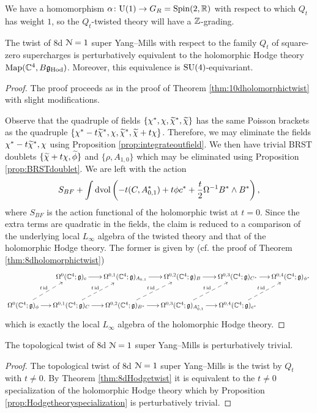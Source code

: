 \documentclass[10pt, oneside]{article}
\renewcommand{\U}{\mathrm{U}}
\begin{document}
We have a homomorphism $\alpha\colon \U(1)\rightarrow G_R=\Spin(2, \RR)$ with respect to which $Q_t$ has weight $1$, so the $Q_t$-twisted theory will have a $\mathbb Z$-grading.

\begin{theorem}
The twist of 8d $\mathcal N=1$ super Yang--Mills with respect to the family $Q_t$ of square-zero supercharges is perturbatively equivalent to the holomorphic Hodge theory $\operatorname{Map}(\mathbb C^4, B\mathfrak g_{\mathrm{Hod}})$. Moreover, this equivalence is $\mathrm{SU}(4)$-equivariant.
\label{thm:8dHodgetwist}
\end{theorem}
\begin{proof}
The proof proceeds as in the proof of Theorem \ref{thm:10dholomorphictwist} with slight modifications.

Observe that the quadruple of fields $\{\chi^*, \chi, \widetilde{\chi}^*, \widetilde{\chi}\}$ has the same Poisson brackets as the quadruple $\{\chi^*-t\widetilde{\chi}^*, \chi, \widetilde{\chi}^*, \widetilde{\chi} + t\chi\}$. Therefore, we may eliminate the fields $\chi^*-t\widetilde{\chi}^*, \chi$ using Proposition \ref{prop:integrateoutfield}. We then have trivial BRST doublets $\{\widetilde{\chi} + t\chi, \widetilde{\phi}\}$ and $\{\rho, A_{1, 0}\}$ which may be eliminated using Proposition \ref{prop:BRSTdoublet}. We are left with the action
\[S_{BF} + \int\operatorname{dvol}\left(-t(C, A_{0, 1}^*) + t\phi c^* + \frac{t}{2} \Omega^{-1} B^*\wedge B^*\right),\]
where $S_{BF}$ is the action functional of the holomorphic twist at $t=0$. Since the extra terms are quadratic in the fields, the claim is reduced to a comparison of the underlying local $L_\infty$ algebra of the twisted theory and that of the holomorphic Hodge theory. The former is given by (cf. the proof of Theorem \ref{thm:8dholomorphictwist})
\[
\xymatrix@C=0.5cm{
&\Omega^0(\CC^4; \gg)_c \ar[r] &\Omega^{0,1}(\CC^4; \gg)_{A_{0,1}} \ar[r] &\Omega^{0,2}(\CC^4; \gg)_{B} \ar[r] &\Omega^{0,3}(\CC^4; \gg)_{C^*} \ar[r] &\Omega^{0,4}(\CC^4; \gg)_{\phi^*} \\
\Omega^0(\CC^4; \gg)_{\phi} \ar[r] \ar@{-->}^{t\id}[ur] & \Omega^{0,1}(\CC^4; \gg)_C \ar[r] \ar@{-->}^{t\id}[ur] &\Omega^{0,2}(\CC^4; \gg)_{B^*} \ar[r] \ar@{-->}^{t\id}[ur] &\Omega^{0,3}(\CC^4; \gg)_{A_{0,1}^*} \ar[r] \ar@{-->}^{t\id}[ur] &\Omega^{0,4}(\CC^4; \gg)_{c^*} \ar@{-->}^{t\id}[ur] &
}
\]
which is exactly the local $L_\infty$ algebra of the holomorphic Hodge theory.
\end{proof}

\begin{corollary}
The topological twist of 8d $\mathcal N=1$ super Yang--Mills is perturbatively trivial.
\label{cor:8dtopologicaltwist}
\end{corollary}
\begin{proof}
The topological twist of 8d $\mathcal N=1$ super Yang--Mills is the twist by $Q_t$ with $t\neq 0$. By Theorem \ref{thm:8dHodgetwist} it is equivalent to the $t\neq 0$ specialization of the holomorphic Hodge theory which by Proposition \ref{prop:Hodgetheoryspecialization} is perturbatively trivial.
\end{proof}
\end{document}
